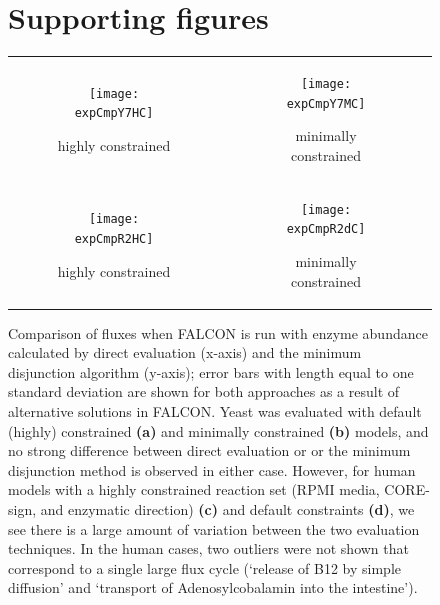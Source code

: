 \renewcommand{\figurename}{\textbf{\suppOrApp \Fig}}
\renewcommand{\tablename}{\textbf{\suppOrApp Table}}

\begin{figure}
\section{Supporting figures}
\centering
\begin{tabular}{cc}
  \begin{subfigure}[b]{0.5\textwidth}
  \texttt{[image: expCmpY7HC]}
  \caption{highly constrained} \label{fig:EnzAbundEval:A}
  \end{subfigure}
&
  \begin{subfigure}[b]{0.5\textwidth}
  \texttt{[image: expCmpY7MC]}
  \caption{minimally constrained} \label{fig:EnzAbundEval:B}
  \end{subfigure} 
\\
  \begin{subfigure}[b]{0.5\textwidth}
  \texttt{[image: expCmpR2HC]}
  \caption{highly constrained} \label{fig:EnzAbundEval:C}
  \end{subfigure}
&
  \begin{subfigure}[b]{0.5\textwidth}
  \texttt{[image: expCmpR2dC]}
  \caption{minimally constrained} \label{fig:EnzAbundEval:D}
  \end{subfigure} 
\\
\end{tabular}
\caption{Comparison of fluxes when FALCON is run with enzyme abundance
calculated by direct evaluation (x-axis) and the minimum disjunction
algorithm (y-axis); error bars with length equal to one standard
deviation are shown for both approaches as a result of alternative
solutions in FALCON. Yeast was evaluated with default (highly)
constrained \textbf{(a)} and minimally constrained \textbf{(b)}
models, and no strong difference between direct evaluation or or the
minimum disjunction method is observed in either case. However, for
human models with a highly constrained reaction set (RPMI media,
CORE-sign, and enzymatic direction) \textbf{(c)} and default
constraints \textbf{(d)}, we see there is a large amount of variation
between the two evaluation techniques. In the human cases, two
outliers were not shown that correspond to a single large flux cycle
(`release of B12 by simple diffusion' and `transport of
Adenosylcobalamin into the intestine').}
\label{fig:EnzAbundEval}
\end{figure}
\FloatBarrier


